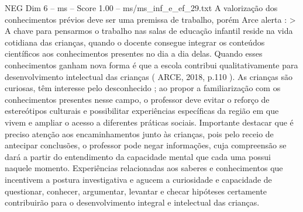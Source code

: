 \begin{textsample}{NEG Dim 6 – ms – Score 1.00 – ms/ms\_inf\_e\_ef\_29.txt}
A valorização dos conhecimentos prévios deve ser uma premissa de trabalho, porém Arce alerta : > A chave para pensarmos o trabalho nas salas de educação infantil reside na vida cotidiana das crianças, quando o docente consegue integrar os conteúdos científicos aos conhecimentos presentes no dia a dia delas.
Quando esses conhecimentos ganham nova forma é que a escola contribui qualitativamente para desenvolvimento intelectual das crianças ( ARCE, 2018, p.110 ).
As crianças são curiosas, têm interesse pelo desconhecido ; ao propor a familiarização com os conhecimentos presentes nesse campo, o professor deve evitar o reforço de estereótipos culturais e possibilitar experiências específicas da região em que vivem e ampliar o acesso a diferentes práticas sociais.
Importante destacar que é preciso atenção aos encaminhamentos junto às crianças, pois pelo receio de antecipar conclusões, o professor pode negar informações, cuja compreensão se dará a partir do entendimento da capacidade mental que cada uma possui naquele momento.
Experiências relacionadas aos saberes e conhecimentos que incentivem a postura investigativa e agucem a curiosidade e capacidade de questionar, conhecer, argumentar, levantar e checar hipóteses certamente contribuirão para o desenvolvimento integral e intelectual das crianças.

\end{textsample}
